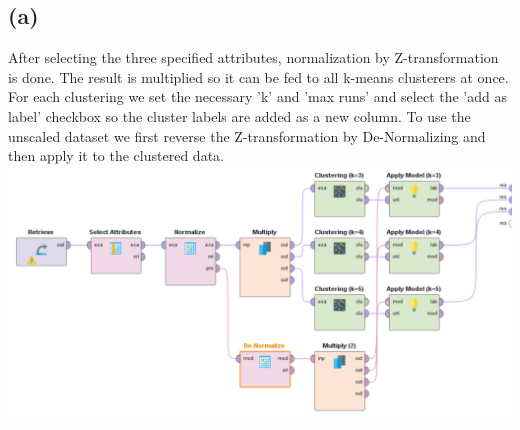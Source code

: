 \documentclass[../../main.tex]{subfiles}
\begin{document}
\subsection*{(a)}
After selecting the three specified attributes, normalization by Z-transformation is done. The result is multiplied so it can be fed to all k-means clusterers at once. For each clustering we set the necessary 'k' and 'max runs' and select the 'add as label' checkbox so the cluster labels are added as a new column. To use the unscaled dataset we first reverse the Z-transformation by De-Normalizing and then apply it to the clustered data.\\  
\includegraphics[width=\textwidth]{img/QUESTION_3a_PROCESS.png}
\end{document}
